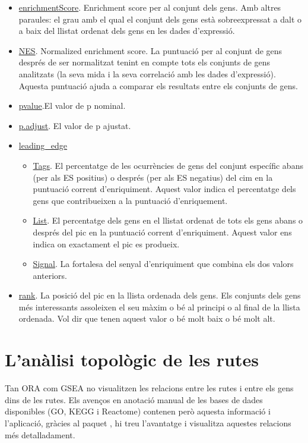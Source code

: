 \begin{itemize}
\item \underline{enrichmentScore}. Enrichment score per al conjunt dels gens. Amb altres paraules: el grau amb el qual el conjunt dels gens està sobreexpressat a dalt o a baix del llistat ordenat dels gens en les dades d'expressió.
\item \underline{NES}. Normalized enrichment score. La puntuació per al conjunt de gens després de ser normalitzat tenint en compte tots els conjunts de gens analitzats (la seva mida i la seva correlació amb les dades d'expressió). Aquesta puntuació ajuda a comparar els resultats entre els conjunts de gens.
\item \underline{pvalue}.El valor de p nominal.
\item \underline{p.adjust}. El valor de p ajustat.
\item \underline{leading\_edge}
\begin{itemize}
\item \underline{Tags}. El percentatge de les ocurrències de gens del conjunt específic abans (per als ES positius) o després (per als ES negatius) del cim en la puntuació corrent d'enriquiment. Aquest valor indica el percentatge dels gens que contribueixen a la puntuació d'enriquement. 
\item \underline{List}. El percentatge dels gens en el llistat ordenat de tots els gens abans o després del pic en la puntuació corrent d'enriquiment. Aquest valor ens indica on exactament el pic es produeix. 
\item \underline{Signal}. La fortalesa del senyal d'enriquiment que combina els dos valors anteriors.
\end{itemize}
\item \underline{rank}. La posició del pic en la llista ordenada dels gens. Els conjunts dels gens més interessants assoleixen el seu màxim o bé al principi o al final de la llista ordenada. Vol dir que tenen aquest valor o bé molt baix o bé molt alt.
\end{itemize}

\section{L'anàlisi topològic de les rutes}
Tan ORA com GSEA no visualitzen les relacions entre les rutes i entre els gens dins de les rutes. Els avenços en anotació manual de les bases de dades disponibles (GO, KEGG i Reactome) contenen però aquesta informació i l'aplicació, gràcies al paquet , hi treu l'avantatge i visualitza aquestes relacions més detalladament. 

